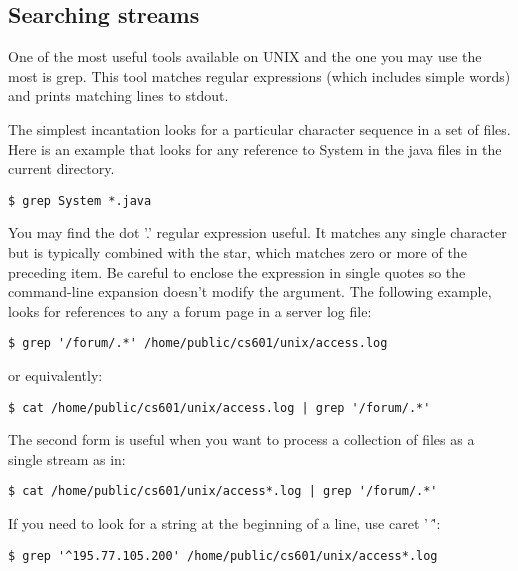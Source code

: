 \begin{fullwidth}
\section{Searching streams}

One of the most useful tools available on UNIX and the one you may use the most is grep. This tool matches regular expressions (which includes simple words) and prints matching lines to stdout.

The simplest incantation looks for a particular character sequence in a set of files. Here is an example that looks for any reference to System in the java files in the current directory.

\begin{lstlisting}[style=BashInputStyle]
$ grep System *.java
\end{lstlisting}

You may find the dot '.' regular expression useful. It matches any single character but is typically combined with the star, which matches zero or more of the preceding item. Be careful to enclose the expression in single quotes so the command-line expansion doesn't modify the argument. The following example, looks for references to any a forum page in a server log file:

\begin{lstlisting}[style=BashInputStyle]
$ grep '/forum/.*' /home/public/cs601/unix/access.log
\end{lstlisting}

\noindent or equivalently:

\begin{lstlisting}[style=BashInputStyle]
$ cat /home/public/cs601/unix/access.log | grep '/forum/.*' 
\end{lstlisting}

\noindent The second form is useful when you want to process a collection of files as a single stream as in:

\begin{lstlisting}[style=BashInputStyle]
$ cat /home/public/cs601/unix/access*.log | grep '/forum/.*'
\end{lstlisting}

\noindent If you need to look for a string at the beginning of a line, use caret ' \^':

\begin{lstlisting}[style=BashInputStyle]
$ grep '^195.77.105.200' /home/public/cs601/unix/access*.log
\end{lstlisting}


\end{fullwidth}
